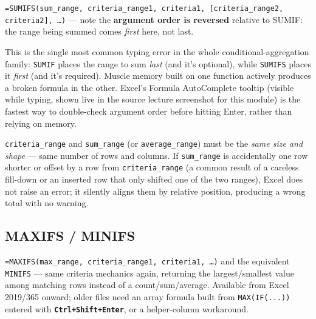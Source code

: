 \documentclass[11pt,a4paper]{article}
\newcommand{\key}[1]{\texttt{\colorbox{black!8}{\textbf{#1}}}}
\begin{document}
\begin{formulasyntax}[SUMIFS]
\texttt{=SUMIFS(sum\_range, criteria\_range1, criteria1, [criteria\_range2, criteria2], \ldots)} --- note the \textbf{argument order is reversed} relative to SUMIF: the range being summed comes \emph{first} here, not last.
\end{formulasyntax}

\begin{pitfall}
This is the single most common typing error in the whole conditional-aggregation family: \texttt{SUMIF} places the range to sum \emph{last} (and it's optional), while \texttt{SUMIFS} places it \emph{first} (and it's required). Muscle memory built on one function actively produces a broken formula in the other. Excel's Formula AutoComplete tooltip (visible while typing, shown live in the source lecture screenshot for this module) is the fastest way to double-check argument order before hitting Enter, rather than relying on memory.
\end{pitfall}

\begin{pitfall}
\texttt{criteria\_range} and \texttt{sum\_range} (or \texttt{average\_range}) must be the \emph{same size and shape} --- same number of rows and columns. If \texttt{sum\_range} is accidentally one row shorter or offset by a row from \texttt{criteria\_range} (a common result of a careless fill-down or an inserted row that only shifted one of the two ranges), Excel does not raise an error; it silently aligns them by relative position, producing a wrong total with no warning.
\end{pitfall}

\subsection{MAXIFS / MINIFS}

\begin{formulasyntax}
\texttt{=MAXIFS(max\_range, criteria\_range1, criteria1, \ldots)} and the equivalent \texttt{MINIFS} --- same criteria mechanics again, returning the largest/smallest value among matching rows instead of a count/sum/average. Available from Excel 2019/365 onward; older files need an array formula built from \texttt{MAX(IF(...))} entered with \key{Ctrl+Shift+Enter}, or a helper-column workaround.
\end{formulasyntax}
\end{document}
